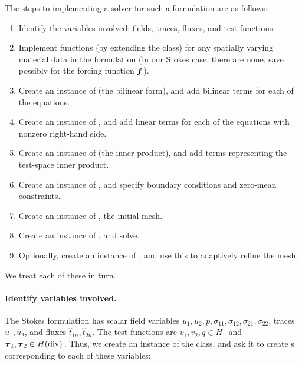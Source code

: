 The steps to implementing a solver for such a formulation are as follows:
\begin{enumerate}
\item Identify the variables involved: fields, traces, fluxes, and test functions.
\item Implement functions (by extending the  class) for any spatially varying material data in the formulation (in our Stokes case, there are none, save possibly for the forcing function $\vect{f}$).
\item Create an instance of  (the bilinear form), and add bilinear terms for each of the equations.
\item Create an instance of , and add linear terms for each of the equations with nonzero right-hand side.
\item Create an instance of  (the inner product), and add terms representing the test-space inner product.
\item Create an instance of , and specify boundary conditions and zero-mean constraints.
\item Create an instance of , the initial mesh.
\item Create an instance of , and solve.
\item Optionally, create an instance of , and use this to adaptively refine the mesh.
\end{enumerate}

We treat each of these in turn.
\paragraph{Identify variables involved.}
The Stokes formulation has scalar field variables $u_{1},u_{2},p,\sigma_{11},\sigma_{12},\sigma_{21},\sigma_{22}$, traces $\widehat{u}_{1},\widehat{u}_{2}$, and fluxes $\widehat{t}_{1n}, \widehat{t}_{2n}$.  The test functions are $v_{1},v_{2},q \in H^{1}$ and $\vect{\tau}_{1},\vect{\tau}_{2} \in \NVRHdiv$.  Thus, we create an instance of the  class, and ask it to create s corresponding to each of these variables:

